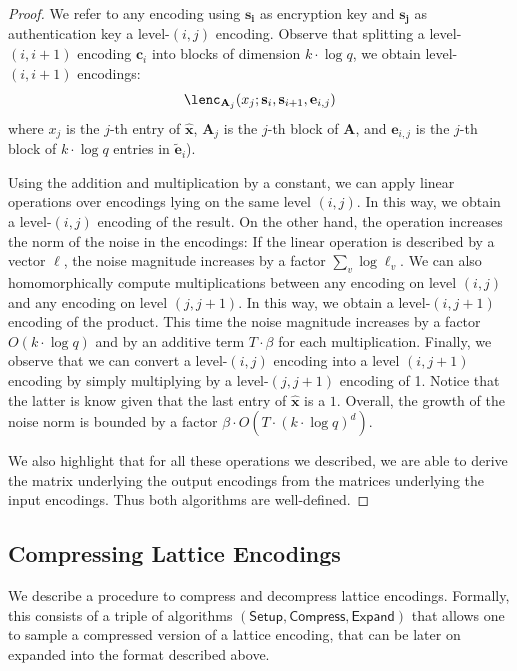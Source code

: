 \documentclass{article}
\newcommand{\Compress}{\mathsf{Compress}}
\newcommand{\algofont}[1]{\ensuremath{\mathsf{#1}}}
\newcommand{\Setup}{{\algofont{Setup}}}
\newcommand{\Expand}{\algofont{Expand}}
\begin{document}
\begin{proof}
We refer to any encoding using $\mathbf{s_i}$ as encryption key and $\mathbf{s_j}$ as authentication key a level-$(i, j)$ encoding. Observe that splitting a level-$(i, i+1)$ encoding $\mathbf{c}_i$ into blocks of dimension $k\cdot \log q$, we obtain level-$(i, i+1)$ encodings: 
\[
\lenc_{\mathbf{A}_j}(x_j; \mathbf{s}_i, \mathbf{s}_{i+1}, \mathbf{e}_{i,j})
\]
where $x_j$ is the $j$-th entry of $\hat{\mathbf{x}}$, $\mathbf{A}_j$ is the $j$-th block of $\mathbf{A}$, and $\mathbf{e}_{i,j}$ is the $j$-th block of $k\cdot\log q$ entries in $\widetilde{\mathbf{e}}_{i}$).

Using the addition and multiplication by a constant, we can apply linear operations over encodings lying on the same level $(i, j)$. In this way, we obtain a level-$(i, j)$ encoding of the result. On the other hand, the operation increases the norm of the noise in the encodings: If the linear operation is described by a vector $\bm{\ell}$, the noise magnitude increases by a factor $\sum_{v} \log \ell_v$.
We can also homomorphically compute multiplications between any encoding on level $(i, j)$ and any encoding on level $(j, j+1)$. In this way, we obtain a level-$(i, j+1)$ encoding of the product. This time the noise magnitude increases by a factor $O(k\cdot \log q)$ and by an additive term $T\cdot \beta$ for each multiplication.
Finally, we observe that we can convert a level-$(i, j)$ encoding into a level $(i, j+1)$ encoding by simply multiplying by a level-$(j, j+1)$ encoding of 1. Notice that the latter is know given that the last entry of $\hat{\mathbf{x}}$ is a $1$.
Overall, the growth of the noise norm is bounded by a factor $\beta \cdot O(T \cdot (k\cdot \log q)^d)$.

We also highlight that for all these operations we described, we are able to derive the matrix underlying the output encodings from the matrices underlying the input encodings. Thus both algorithms are well-defined.
\end{proof}

\subsection{Compressing Lattice Encodings}\label{sec:comp_enc}

We describe a procedure to compress and decompress lattice encodings. Formally, this consists of a triple of algorithms $(\Setup, \Compress, \Expand)$ that allows one to sample a compressed version of a lattice encoding, that can be later on expanded into the format described above.
\end{document}
